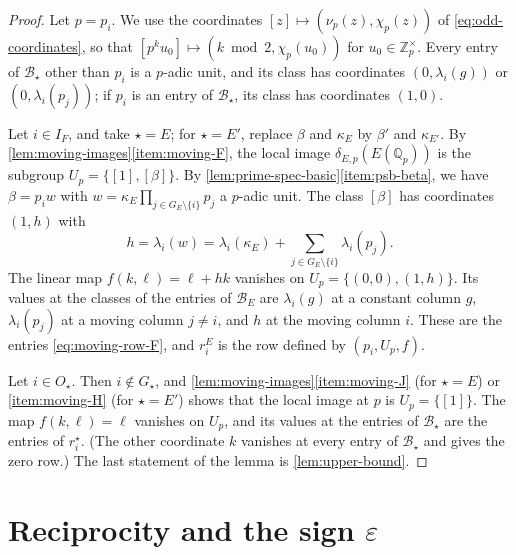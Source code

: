 \documentclass[12pt,oneside,openany]{book}
\theoremstyle{definition}
\theoremstyle{plain}
\numberwithin{equation}{chapter}
\theoremstyle{plain}
\theoremstyle{definition}
\theoremstyle{remark}
\newcommand{\Q}{\mathbb Q}
\newcommand{\Z}{\mathbb Z}
\newcommand{\sq}[1]{[#1]}
\newcommand{\cB}{\mathcal B}
\newcommand{\eps}{\varepsilon}
\begin{document}
\begin{proof}
Let $p=p_i$. We use the coordinates $\sq z\mapsto(\nu_p(z),\chi_p(z))$ of \eqref{eq:odd-coordinates}, so that $\sq{p^ku_0}\mapsto(k\bmod2,\chi_p(u_0))$ for $u_0\in\Z_p^\times$. Every entry of $\cB_\star$ other than $p_i$ is a $p$-adic unit, and its class has coordinates $(0,\lambda_i(g))$ or $(0,\lambda_i(p_j))$; if $p_i$ is an entry of $\cB_\star$, its class has coordinates $(1,0)$.

Let $i\in I_F$, and take $\star=E$; for $\star=E'$, replace $\beta$ and $\kappa_E$ by $\beta'$ and $\kappa_{E'}$. By \cref{lem:moving-images}\ref{item:moving-F}, the local image $\delta_{E,p}(E(\Q_p))$ is the subgroup $U_p=\{\sq1,\sq\beta\}$. By \cref{lem:prime-spec-basic}\ref{item:psb-beta}, we have $\beta=p_iw$ with $w=\kappa_E\prod_{j\in G_E\setminus\{i\}}p_j$ a $p$-adic unit. The class $\sq\beta$ has coordinates $(1,h)$ with
\begin{equation}
h=\lambda_i(w)=\lambda_i(\kappa_E)+\sum_{j\in G_E\setminus\{i\}}\lambda_i(p_j).
\end{equation}
The linear map $f(k,\ell)=\ell+hk$ vanishes on $U_p=\{(0,0),(1,h)\}$. Its values at the classes of the entries of $\cB_E$ are $\lambda_i(g)$ at a constant column $g$, $\lambda_i(p_j)$ at a moving column $j\ne i$, and $h$ at the moving column $i$. These are the entries \eqref{eq:moving-row-F}, and $r^E_i$ is the row defined by $(p_i,U_p,f)$.

Let $i\in O_\star$. Then $i\notin G_\star$, and \cref{lem:moving-images}\ref{item:moving-J} (for $\star=E$) or \ref{item:moving-H} (for $\star=E'$) shows that the local image at $p$ is $U_p=\{\sq1\}$. The map $f(k,\ell)=\ell$ vanishes on $U_p$, and its values at the entries of $\cB_\star$ are the entries of $r^\star_i$. (The other coordinate $k$ vanishes at every entry of $\cB_\star$ and gives the zero row.) The last statement of the lemma is \cref{lem:upper-bound}.
\end{proof}

\section{Reciprocity and the sign \texorpdfstring{$\eps$}{epsilon}}\label{sec:families-reciprocity}
\end{document}
